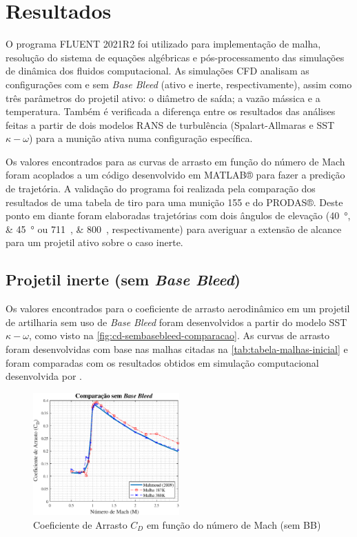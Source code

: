 \chapter{Resultados}\label{cap:resultados}
\graphicspath{{chapter-07/img-cap07/}}

O programa FLUENT 2021R2 \cite{fluent2021ansys} foi utilizado para implementação de malha, resolução do sistema de equações algébricas e pós-processamento das simulações de dinâmica dos fluidos computacional. As simulações CFD analisam as configurações com e sem \textit{Base Bleed} (ativo e inerte, respectivamente), assim como três parâmetros do projetil ativo: o diâmetro de saída; a vazão mássica e a temperatura. Também é verificada a diferença entre os resultados das análises feitas a partir de dois modelos RANS de turbulência (Spalart-Allmaras e SST \(\kappa-\omega\)) para a munição ativa numa configuração específica.

Os valores encontrados para as curvas de arrasto em função do número de Mach foram acoplados a um código desenvolvido em MATLAB® para fazer a predição de trajetória. A validação do programa foi realizada pela comparação dos resultados de uma tabela de tiro para uma munição \qty{155}{\millimetre} e do PRODAS®. Deste ponto em diante foram elaboradas trajetórias com dois ângulos de elevação (\qtylist{40;45}{\degree} ou \qtylist{711;800}{\milliradian}, respectivamente) para averiguar a extensão de alcance para um projetil ativo sobre o caso inerte.

\section{Projetil inerte (sem \textit{Base Bleed})}\label{sec:resultados-sem-basebleed}

Os valores encontrados para o coeficiente de arrasto aerodinâmico em um projetil de artilharia sem uso de \textit{Base Bleed} foram desenvolvidos a partir do modelo SST \(\kappa-\omega\), como visto na \autoref{fig:cd-sembasebleed-comparacao}. As curvas de arrasto foram desenvolvidas com base nas malhas citadas na \autoref{tab:tabela-malhas-inicial} e foram comparadas com os resultados obtidos em simulação computacional desenvolvida por \citeauthor{Mahmoud2009}. 

\begin{figure}[!htpb]
	\centering
	\includegraphics[width=0.5\textwidth]{cd-sembasebleed-comparacao.eps}
	\caption{Coeficiente de Arrasto \(C_{D}\) em função do número de Mach (sem BB)}
	\label{fig:cd-sembasebleed-comparacao}
\end{figure}

